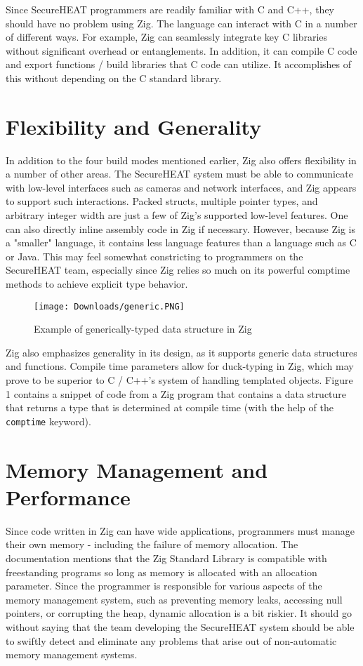 Since SecureHEAT programmers are readily familiar with C and C++, they should have no problem using Zig. The language can interact with C in a number of different ways. For example, Zig can seamlessly integrate key C libraries without significant overhead or entanglements. In addition, it can compile C code and export functions / build libraries that C code can utilize. It accomplishes of this without depending on the C standard library.

\section{Flexibility and Generality}

In addition to the four build modes mentioned earlier, Zig also offers flexibility in a number of other areas. The SecureHEAT system must be able to communicate with low-level interfaces such as cameras and network interfaces, and Zig appears to support such interactions. Packed structs, multiple pointer types, and arbitrary integer width are just a few of Zig's supported low-level features. One can also directly inline assembly code in Zig if necessary. However, because Zig is a "smaller" language, it contains less language features than a language such as C or Java. This may feel somewhat constricting to programmers on the SecureHEAT team, especially since Zig relies so much on its powerful comptime methods to achieve explicit type behavior. 

\begin{figure}
\caption{Example of generically-typed data structure in Zig}
\texttt{[image: Downloads/generic.PNG]} 

\end{figure}



Zig also emphasizes generality in its design, as it supports generic data structures and functions. Compile time parameters allow for duck-typing in Zig, which may prove to be superior to C / C++'s system of handling templated objects. Figure 1 contains a snippet of code from a Zig program that contains a data structure that returns a type that is determined at compile time (with the help of the \verb +comptime+ keyword). 


\section{Memory Management and Performance}
Since code written in Zig can have wide applications, programmers must manage their own memory - including the failure of memory allocation. The documentation mentions that the Zig Standard Library is compatible with freestanding programs so long as memory is allocated with an allocation parameter. Since the programmer is responsible for various aspects of the memory management system, such as preventing memory leaks, accessing null pointers, or corrupting the heap, dynamic allocation is a bit riskier. It should go without saying that the team developing the SecureHEAT system should be able to swiftly detect and eliminate any problems that arise out of non-automatic memory management systems.

